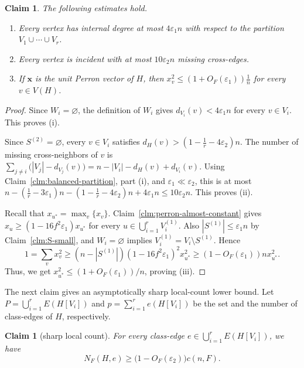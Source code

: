 \documentclass[11pt,a4paper]{article}
\newtheorem{claim}[theorem]{Claim}
\theoremstyle{definition}
\theoremstyle{plain}
\newcommand{\eps}{\varepsilon}
\renewcommand{\le}{\leqslant}
\renewcommand{\ge}{\geqslant}
\begin{document}
\begin{claim} \label{clm:clean-case}
The following estimates hold.
\begin{enumerate}[label=\textup{(\roman*)}]
\item Every vertex has internal degree at most $4\eps_1n$ with respect to the partition $V_1\cup\cdots\cup V_r$.
\item Every vertex is incident with at most $10\eps_2n$ missing cross-edges.
\item If $\bm{x}$ is the unit Perron vector of $H$, 
then $ x_v^2\le (1+O_F(\eps_1))\frac1n$ for every 
$v\in V(H)$. 
\end{enumerate}
\end{claim}

\begin{proof}
Since $W_i=\varnothing$, the definition of $W_i$ gives $d_{V_i}(v)<4\eps_1n$ for every $v\in V_i$.  This proves (i).

Since $S^{(2)}=\varnothing$, every $v\in V_i$ satisfies
$ d_H(v)>\left(1-\frac1r-4\eps_2\right)n$. 
The number of missing cross-neighbors of $v$ is
$
  \sum_{j\ne i}\bigl(|V_j|-d_{V_j}(v)\bigr)
  =n-|V_i|-d_H(v)+d_{V_i}(v)$. 
Using Claim~\ref{clm:balanced-partition}, part (i), and $\eps_1\ll\eps_2$, this is at most
$
  n-\left(\frac1r-3\eps_1\right)n
  -\left(1-\frac1r-4\eps_2\right)n+4\eps_1n
  \le 10\eps_2n$.
This proves (ii).

Recall that $x_{u^\ast}=\max_v \{x_v\}$.  Claim~\ref{clm:perron-almost-constant} gives $ x_u\ge(1-16f^2\eps_1)x_{u^\ast}$  
for every  $u\in \bigcup_{i=1}^r V_i^{(1)}$. 
Also $|S^{(1)}|\le\eps_1n$ by Claim~\ref{clm:S-small}, and $W_i=\varnothing$ implies $V_i^{(1)}=V_i\setminus S^{(1)}$.  Hence
\[
  1=\sum_vx_v^2
  \ge (n-|S^{(1)}|)(1-16f^2\eps_1)^2x_{u^\ast}^2
  \ge (1-O_F(\eps_1))n x_{u^\ast}^2.
\]
Thus, we get $x_{u^\ast}^2\le(1+O_F(\eps_1))/n$, proving (iii).
\end{proof}

The next claim gives an asymptotically sharp local-count lower bound. 
 Let $P=\bigcup_{i=1}^rE(H[V_i])$ and $p=\sum_{i=1}^r e(H[V_i])$ be the set and the number of class-edges of $H$, respectively. 

\begin{claim}[sharp local count]\label{clm:sharp-local-count}
For every class-edge $e\in \bigcup_{i=1}^rE(H[V_i])$, we have 
\begin{equation*} 
  N_F(H,e)\ge \big(1-O_F(\eps_2) \big)c(n,F).
\end{equation*}
\end{claim}
\end{document}
